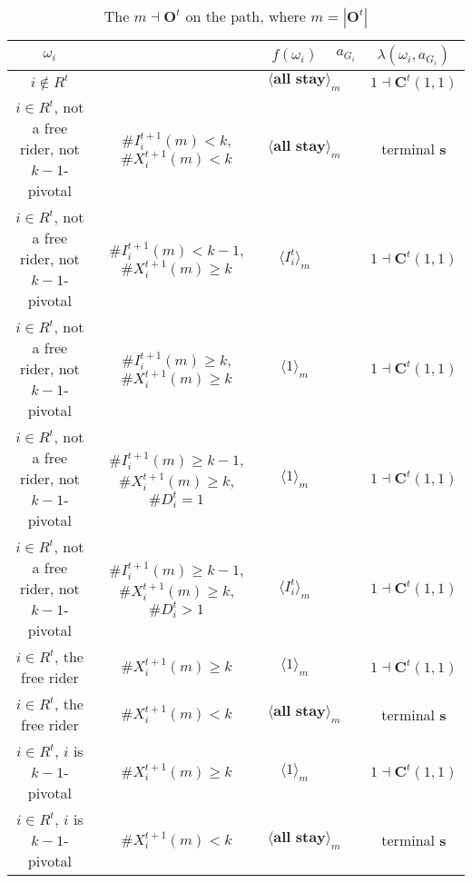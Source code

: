 \documentclass[12pt,letter]{article}
\newcommand{\Kappa}{\mathbf{C}}
\newcommand{\Omicron}{\mathbf{O}}
\theoremstyle{definition}
\theoremstyle{remark}
\theoremstyle{claim}
\begin{document}
\begin{landscape}
\begin{table}[!htbp]
\caption{The $m\dashv\Omicron^t$ on the path, where $m=|\Omicron^t|$}
\label{table:eqm_path_ot2}
\begin{center}
\begin{tabular}{c c | c | c | c}
$\omega_i$ 	 & 	   &	$f(\omega_i)$  &	$a_{G_i}$ & $\lambda(\omega_i,a_{G_i})$ \\
\hline
\hline
$i\notin R^t$  	& 								& $\langle \textbf{all stay} \rangle_m$		&  			& $1\dashv \Kappa^t(1,1)$ \\
$i\in R^t$, not a free rider, not $k-1$-pivotal		 	&  $\#I^{t+1}_i(m)< k$, $\#X^{t+1}_i(m)<k$			&  $\langle \textbf{all stay} \rangle_m$	& 	& terminal \textbf{s} \\
$i\in R^t$, not a free rider, not $k-1$-pivotal	  	& $\#I^{t+1}_i(m)<k-1$, $\#X^{t+1}_i(m)\geq k$		    & $\langle I^t_i \rangle_m$ 		&    			& $1\dashv \Kappa^t(1,1)$ \\
$i\in R^t$, not a free rider, not $k-1$-pivotal	 	&  $\#I^{t+1}_i(m)\geq k$, $\#X^{t+1}_i(m)\geq k$	& $\langle 1 \rangle_m$ 	& 	& $1\dashv \Kappa^t(1,1)$ \\
$i\in R^t$, not a free rider, not $k-1$-pivotal	 	&  $\#I^{t+1}_i(m)\geq k-1$, $\#X^{t+1}_i(m)\geq k$, $\#D^t_i=1$	& $\langle 1 \rangle_m$ 	& 	& $1\dashv \Kappa^t(1,1)$ \\
$i\in R^t$, not a free rider, not $k-1$-pivotal	 	&  $\#I^{t+1}_i(m)\geq k-1$, $\#X^{t+1}_i(m)\geq k$, $\#D^t_i>1$	& $\langle I^t_i \rangle_m$ 	& 	& $1\dashv \Kappa^t(1,1)$ \\
$i\in R^t$, the free rider  	&  $\#X^{t+1}_i(m)\geq k$ & $\langle 1 \rangle_m$ 		& 				  & $1\dashv \Kappa^t(1,1)$ \\
$i\in R^t$, the free rider  	&  		$\#X^{t+1}_i(m)<k$					&  $\langle \textbf{all stay} \rangle_m$		& 										  & terminal \textbf{s} \\
$i\in R^t$, $i$ is $k-1$-pivotal  	&  $\#X^{t+1}_i(m)\geq k$ & $\langle 1 \rangle_m$ 	& 											 & $1\dashv \Kappa^t(1,1)$ \\
$i\in R^t$, $i$ is $k-1$-pivotal  	&  	$\#X^{t+1}_i(m)<k$		&  $\langle \textbf{all stay} \rangle_m$	& 											 & terminal \textbf{s} \\
\hline
\end{tabular}
\end{center}
\end{table}


\end{landscape}
\end{document}
